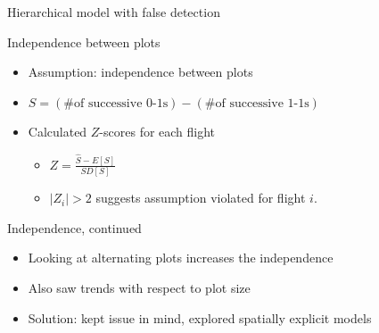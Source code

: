 \documentclass{beamer}
\begin{document}
\begin{frame}{Hierarchical model with false detection}
	\begin{center}
	\end{center}
\end{frame}

\begin{frame}{Independence between plots}
	\begin{itemize}
		\item Assumption: independence between plots
		\item $S=(\text{\# of successive 0-1s})-(\text{\# of successive 1-1s})$
		\item Calculated $Z$-scores for each flight
			\begin{itemize}
				\item $Z=\frac{\hat{S}-E[S]}{SD[S]}$
				\item $|Z_i|>2$ suggests assumption violated for flight $i$.
			\end{itemize}
	\end{itemize}
\end{frame}

\begin{frame}{Independence, continued}

	\begin{itemize}
		\item Looking at alternating plots increases the independence
		\item Also saw trends with respect to plot size
		\item Solution: kept issue in mind, explored spatially explicit models
	\end{itemize}
\end{frame}
\end{document}
